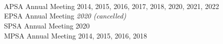 \documentclass[11pt]{article}
\begin{document}
\vspace{.2in}
\begin{minipage}[t]{.21\textwidth}
	 \\
	 \\
	 \\
\end{minipage}
\begin{minipage}[t]{.79\textwidth}
APSA Annual Meeting \hfill 2014, 2015, 2016, 2017, 2018, 2020, 2021, 2022 \\
EPSA Annual Meeting \hfill \emph{2020 (cancelled)} \\
SPSA Annual Meeting \hfill 2020 \\
MPSA Annual Meeting  \hfill 2014, 2015, 2016, 2018 \\



\end{minipage}
\end{document}
